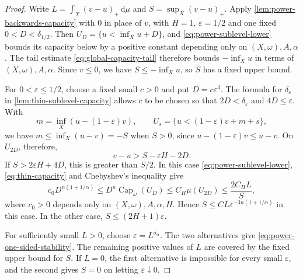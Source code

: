 \begin{proof}
Write $L=\int_X(v-u)_+\,\mathrm d\mu$ and $S=\sup_X(v-u)_+$. Apply \cref{lem:power-backwards-capacity} with $0$ in place of $v$, with $H=1$, $\varepsilon=1/2$ and one fixed $0<D<\delta_{1/2}$. Then $U_D=\{u<\inf_Xu+D\}$, and \eqref{eq:power-sublevel-lower} bounds its capacity below by a positive constant depending only on $(X,\omega),A,\alpha$. The tail estimate \eqref{eq:global-capacity-tail} therefore bounds $-\inf_Xu$ in terms of $(X,\omega),A,\alpha$. Since $v\leq0$, we have $S\leq-\inf_Xu$, so $S$ has a fixed upper bound.

For $0<\varepsilon\leq1/2$, choose a fixed small $c>0$ and put $D=c\varepsilon^3$. The formula for $\delta_\varepsilon$ in \cref{lem:thin-sublevel-capacity} allows $c$ to be chosen so that $2D<\delta_\varepsilon$ and $4D\leq\varepsilon$. With
\[
 m=\inf_X(u-(1-\varepsilon)v),\qquad
 U_s=\{u<(1-\varepsilon)v+m+s\},
\]
we have $m\leq\inf_X(u-v)=-S$ when $S>0$, since $u-(1-\varepsilon)v\leq u-v$. On $U_{2D}$, therefore,
\[
 v-u>S-\varepsilon H-2D.
\]
If $S>2\varepsilon H+4D$, this is greater than $S/2$. In this case \eqref{eq:power-sublevel-lower}, \eqref{eq:thin-capacity} and Chebyshev's inequality give
\[
 c_0D^{n(1+1/\alpha)}
 \leq D^n\operatorname{Cap}_\omega(U_D)
 \leq C_H\mu(U_{2D})\leq\frac{2C_HL}{S},
\]
where $c_0>0$ depends only on $(X,\omega),A,\alpha,H$. Hence $S\leq CL\varepsilon^{-3n(1+1/\alpha)}$ in this case. In the other case, $S\leq(2H+1)\varepsilon$.

For sufficiently small $L>0$, choose $\varepsilon=L^{\sigma_\alpha}$. The two alternatives give \eqref{eq:power-one-sided-stability}. The remaining positive values of $L$ are covered by the fixed upper bound for $S$. If $L=0$, the first alternative is impossible for every small $\varepsilon$, and the second gives $S=0$ on letting $\varepsilon\downarrow0$.
\end{proof}
